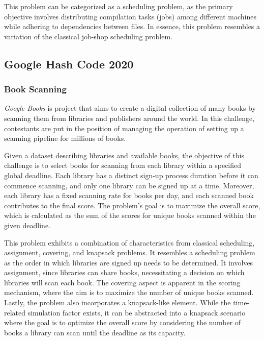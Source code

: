This problem can be categorized as a scheduling problem, as the primary
objective involves distributing compilation tasks (jobs) among different
machines while adhering to dependencies between files. In essence, this problem
resembles a variation of the classical job-shop scheduling problem.

\subsection{Google Hash Code 2020}
\label{subsec:hashcode-2020}

\subsubsection*{Book Scanning}
\label{subsubsec:hashcode-2020-qualification}

\textit{Google Books} is project that aims to create a digital collection of many books
by scanning them from libraries and publishers around the world. In this
challenge, contestants are put in the position of managing the operation of
setting up a scanning pipeline for millions of books.

Given a dataset describing libraries and available books, the objective of this
challenge is to select books for scanning from each library within a specified
global deadline. Each library has a distinct sign-up process duration before it can
commence scanning, and only one library can be signed up at a time. Moreover,
each library has a fixed scanning rate for books per day, and each scanned book
contributes to the final score. The problem's goal is to maximize the overall
score, which is calculated as the sum of the scores for unique books scanned
within the given deadline.

This problem exhibits a combination of characteristics from classical
scheduling, assignment, covering, and knapsack problems. It resembles a
scheduling problem as the order in which libraries are signed up needs to be
determined. It involves assignment, since libraries can share books,
necessitating a decision on which libraries will scan each book. The covering
aspect is apparent in the scoring mechanism, where the aim is to maximize the
number of unique books scanned.  Lastly, the problem also incorporates a
knapsack-like element. While the time-related simulation factor exists, it can
be abstracted into a knapsack scenario where the goal is to optimize the overall
score by considering the number of books a library can scan until the deadline
as its capacity.


